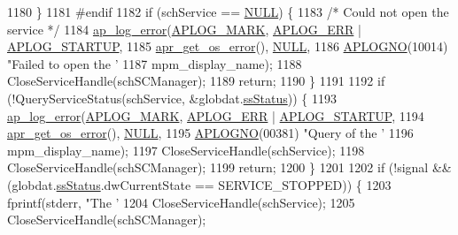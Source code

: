 \begin{DoxyCode}
1180     \}
1181 \textcolor{preprocessor}{#endif}
1182     \textcolor{keywordflow}{if} (schService == \hyperlink{pcre_8txt_ad7f989d16aa8ca809a36bc392c07fba1}{NULL}) \{
1183         \textcolor{comment}{/* Could not open the service */}
1184         \hyperlink{group__APACHE__CORE__LOG_ga5e6676c87418af7a1d323a116c78ecb4}{ap\_log\_error}(\hyperlink{group__APACHE__CORE__LOG_ga655e126996849bcb82e4e5a14c616f4a}{APLOG\_MARK}, \hyperlink{group__APACHE__CORE__LOG_ga57ad94ed8c92c4306de90479251a5d58}{APLOG\_ERR} | 
      \hyperlink{group__APACHE__CORE__LOG_ga39efd19b052fb6f39d8f263c16cc82b7}{APLOG\_STARTUP},
1185                      \hyperlink{group__apr__errno_gaa76e122da00af0ce2e8c8d7ff538bdfa}{apr\_get\_os\_error}(), \hyperlink{pcre_8txt_ad7f989d16aa8ca809a36bc392c07fba1}{NULL},
1186                      \hyperlink{group__APACHE__CORE__LOG_ga1dee8a07e06bc5b3de8b89662c2cd666}{APLOGNO}(10014) \textcolor{stringliteral}{"Failed to open the '%
1187                      mpm\_display\_name);
1188         CloseServiceHandle(schSCManager);
1189         \textcolor{keywordflow}{return};
1190     \}
1191 
1192     \textcolor{keywordflow}{if} (!QueryServiceStatus(schService, &globdat.\hyperlink{structnt__service__ctx__t_a073bebf7ee94c8770e34da99914bbe37}{ssStatus})) \{
1193         \hyperlink{group__APACHE__CORE__LOG_ga5e6676c87418af7a1d323a116c78ecb4}{ap\_log\_error}(\hyperlink{group__APACHE__CORE__LOG_ga655e126996849bcb82e4e5a14c616f4a}{APLOG\_MARK}, \hyperlink{group__APACHE__CORE__LOG_ga57ad94ed8c92c4306de90479251a5d58}{APLOG\_ERR} | 
      \hyperlink{group__APACHE__CORE__LOG_ga39efd19b052fb6f39d8f263c16cc82b7}{APLOG\_STARTUP},
1194                      \hyperlink{group__apr__errno_gaa76e122da00af0ce2e8c8d7ff538bdfa}{apr\_get\_os\_error}(), \hyperlink{pcre_8txt_ad7f989d16aa8ca809a36bc392c07fba1}{NULL},
1195                      \hyperlink{group__APACHE__CORE__LOG_ga1dee8a07e06bc5b3de8b89662c2cd666}{APLOGNO}(00381) \textcolor{stringliteral}{"Query of the '%
1196                      mpm\_display\_name);
1197         CloseServiceHandle(schService);
1198         CloseServiceHandle(schSCManager);
1199         \textcolor{keywordflow}{return};
1200     \}
1201 
1202     \textcolor{keywordflow}{if} (!signal && (globdat.\hyperlink{structnt__service__ctx__t_a073bebf7ee94c8770e34da99914bbe37}{ssStatus}.dwCurrentState == SERVICE\_STOPPED)) \{
1203         fprintf(stderr, \textcolor{stringliteral}{"The '%
1204         CloseServiceHandle(schService);
1205         CloseServiceHandle(schSCManager);
}}}
\end{DoxyCode}
